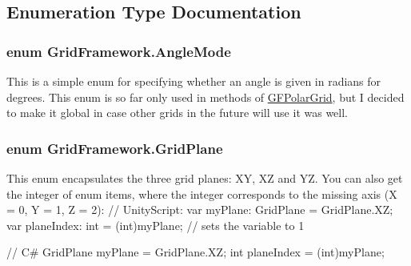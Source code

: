 \subsection{Enumeration Type Documentation}
\hypertarget{namespace_grid_framework_af11322a36c09698c9ad2fa65f85320a9_af11322a36c09698c9ad2fa65f85320a9}{
\subsubsection[{Angle\+Mode}]{\setlength{\rightskip}{0pt plus 5cm}enum {\bf Grid\+Framework.\+Angle\+Mode}}}\label{namespace_grid_framework_af11322a36c09698c9ad2fa65f85320a9_af11322a36c09698c9ad2fa65f85320a9}
This is a simple enum for specifying whether an angle is given in radians for degrees. This enum is so far only used in methods of \hyperlink{class_g_f_polar_grid}{G\+F\+Polar\+Grid}, but I decided to make it global in case other grids in the future will use it was well. \hypertarget{namespace_grid_framework_aa55de93079e09bd55c4cb660025820d5_aa55de93079e09bd55c4cb660025820d5}{
\subsubsection[{Grid\+Plane}]{\setlength{\rightskip}{0pt plus 5cm}enum {\bf Grid\+Framework.\+Grid\+Plane}}}\label{namespace_grid_framework_aa55de93079e09bd55c4cb660025820d5_aa55de93079e09bd55c4cb660025820d5}
This enum encapsulates the three grid planes\+: X\+Y, X\+Z and Y\+Z. You can also get the integer of enum items, where the integer corresponds to the missing axis (X = 0, Y = 1, Z = 2)\+: {\ttfamily  // Unity\+Script\+: var my\+Plane\+: Grid\+Plane = Grid\+Plane.\+X\+Z; var plane\+Index\+: int = (int)my\+Plane; // sets the variable to 1}

{\ttfamily // C\# Grid\+Plane my\+Plane = Grid\+Plane.\+X\+Z; int plane\+Index = (int)my\+Plane; } 